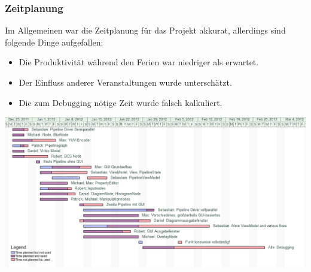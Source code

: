 \documentclass[t]{beamer}
\begin{document}
\begin{frame}
    \frametitle{Zeitplanung}
    Im Allgemeinen war die Zeitplanung für das Projekt akkurat, allerdings sind folgende Dinge aufgefallen:
    \begin{itemize}
        \item Die Produktivität während den Ferien war niedriger als erwartet.
        \item Der Einfluss anderer Veranstaltungen wurde unterschätzt.
        \item Die zum Debugging nötige Zeit wurde falsch kalkuliert.
    \end{itemize}
    \hspace{0.8cm}
    \includegraphics[scale=0.35]{images/gantt.png}
\end{frame}


\end{document}
